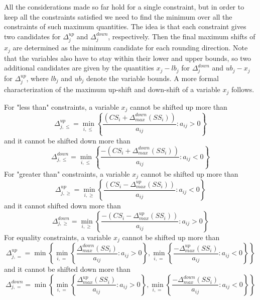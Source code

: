 \documentclass[a4paper,12pt]{book}
\begin{document}
All the considerations made so far hold for a single constraint, but in order to keep all the constraints satisfied we need to find the minimum over all the constraints of such maximum quantities. The idea is that each constraint gives two candidates for $\Delta_{j}^{up}$ and $\Delta_{j}^{down}$, respectively. Then the final maximum shifts of $x_j$ are determined as the minimum candidate for each rounding direction. 
Note that the variables also have to stay within their lower and upper bounds, so two additional candidates are given by the quantities $x_j - lb_j$ for $\Delta_{j}^{down}$ and $ub_j - x_j$ for $\Delta_{j}^{up}$, where $lb_j$ and $ub_j$ denote the variable bounds.
A more formal characterization of the maximum up-shift and down-shift of a variable $x_j$ follows. \par

For "less than" constraints, a variable $x_j$ cannot be shifted up more than
\begin{equation}
	\Delta_{j,\leq}^{up} = \min_{i,\leq}\left\{\dfrac{(CS_i + \Delta_{max}^{down}(SS_i))}{a_{ij}} : a_{ij} > 0\right\}
\end{equation}
and it cannot be shifted down more than
\begin{equation}
	\Delta_{j,\leq}^{down} = \min_{i,\leq}\left\{\dfrac{-(CS_i + \Delta_{max}^{down}(SS_i))}{a_{ij}} : a_{ij} < 0\right\}
\end{equation}
For "greater than" constraints, a variable $x_j$ cannot be shifted up more than
\begin{equation}
	\Delta_{j,\geq}^{up} = \min_{i,\geq}\left\{\dfrac{(CS_i - \Delta_{max}^{up}(SS_i))}{a_{ij}} : a_{ij} < 0\right\}
\end{equation}
and it cannot shifted down more than
\begin{equation}
	\Delta_{j,\geq}^{down} = \min_{i,\geq}\left\{\dfrac{-(CS_i - \Delta_{max}^{up}(SS_i))}{a_{ij}} : a_{ij} > 0\right\}
\end{equation}
For equality constraints, a variable $x_j$ cannot be shifted up more than
\begin{equation}
	\Delta_{j,=}^{up} = \min \left\{ \min_{i,=}\left\{\dfrac{\Delta_{max}^{down}(SS_i)}{a_{ij}} : a_{ij} > 0\right\} , \min_{i,=}\left\{\dfrac{-\Delta_{max}^{up}(SS_i)}{a_{ij}} : a_{ij} < 0 \right\} \right\}
\end{equation}
and it cannot be shifted down more than
\begin{equation}
	\Delta_{j,=}^{down} = \min \left\{ \min_{i,=}\left\{\dfrac{\Delta_{max}^{up}(SS_i)}{a_{ij}} : a_{ij} > 0\right\} , \min_{i,=}\left\{\dfrac{-\Delta_{max}^{down}(SS_i)}{a_{ij}} : a_{ij} < 0 \right\} \right\}
\end{equation}
\end{document}
